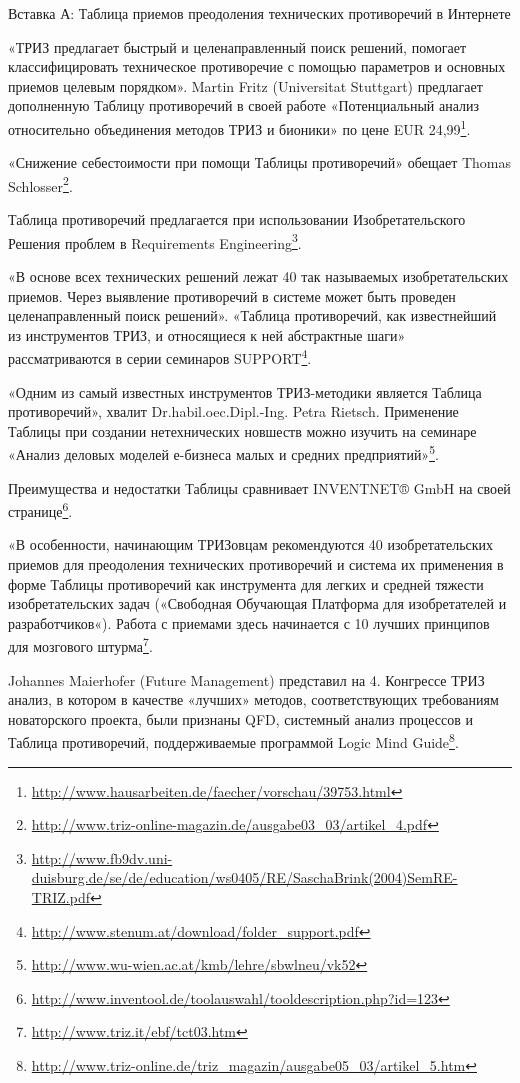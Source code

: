 \documentclass[11pt,a4paper]{article}
\begin{document}
Вставка А: Таблица приемов преодоления технических противоречий в Интернете

«ТРИЗ предлагает быстрый и целенаправленный поиск решений, помогает
классифицировать техническое противоречие с помощью параметров и основных
приемов целевым порядком». Martin Fritz (Universitat Stuttgart) предлагает
дополненную Таблицу противоречий в своей работе «Потенциальный анализ
относительно объединения методов ТРИЗ и бионики» по цене EUR
24,99\footnote{\url{http://www.hausarbeiten.de/faecher/vorschau/39753.html}}.

«Снижение себестоимости при помощи Таблицы противоречий» обещает Thomas
Schlosser\footnote{\url{http://www.triz-online-magazin.de/ausgabe03_03/artikel_4.pdf}}.

Таблица противоречий предлагается при использовании Изобретательского Решения
проблем в Requirements
Engineering\footnote{\url{http://www.fb9dv.uni-duisburg.de/se/de/education/ws0405/RE/SaschaBrink(2004)SemRE-TRIZ.pdf}}.

«В основе всех технических решений лежат 40 так называемых изобретательских
приемов. Через выявление противоречий в системе может быть проведен
целенаправленный поиск решений». «Таблица противоречий, как известнейший из
инструментов ТРИЗ, и относящиеся к ней абстрактные шаги» рассматриваются в
серии семинаров
SUPPORT\footnote{\url{http://www.stenum.at/download/folder_support.pdf}}.

«Одним из самый известных инструментов ТРИЗ-методики является Таблица
противоречий», хвалит Dr.habil.oec.Dipl.-Ing. Petra Rietsch. Применение
Таблицы при создании нетехнических новшеств можно изучить на семинаре «Анализ
деловых моделей е-бизнеса малых и средних
предприятий»\footnote{\url{http://www.wu-wien.ac.at/kmb/lehre/sbwlneu/vk52}}.

Преимущества и недостатки Таблицы сравнивает INVENTNET® GmbH на своей
странице\footnote{\url{http://www.inventool.de/toolauswahl/tooldescription.php?id=123}}.

«В особенности, начинающим ТРИЗовцам рекомендуются 40 изобретательских приемов
для преодоления технических противоречий и система их применения в форме
Таблицы противоречий как инструмента для легких и средней тяжести
изобретательских задач («Свободная Обучающая Платформа для изобретателей и
разработчиков«). Работа с приемами здесь начинается с 10 лучших принципов для
мозгового штурма\footnote{\url{http://www.triz.it/ebf/tct03.htm}}.

Johannes Maierhofer (Future Management) представил на 4. Конгрессе ТРИЗ
анализ, в котором в качестве «лучших» методов, соответствующих требованиям
новаторского проекта, были признаны QFD, системный анализ процессов и Таблица
противоречий, поддерживаемые программой Logic Mind
Guide\footnote{\url{http://www.triz-online.de/triz_magazin/ausgabe05_03/artikel_5.htm}}.
\end{document}
